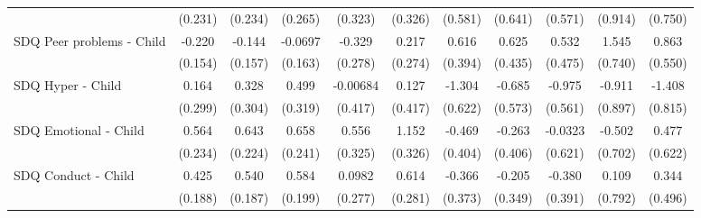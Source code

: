 {\begin{tabular}{l*{10}{c}}
            &     (0.231)         &     (0.234)         &     (0.265)         &     (0.323)         &     (0.326)         &     (0.581)         &     (0.641)         &     (0.571)         &     (0.914)         &     (0.750)         \\
\addlinespace
SDQ Peer problems - Child&      -0.220         &      -0.144         &     -0.0697         &      -0.329         &       0.217         &       0.616         &       0.625         &       0.532         &       1.545\sym{*}  &       0.863         \\
            &     (0.154)         &     (0.157)         &     (0.163)         &     (0.278)         &     (0.274)         &     (0.394)         &     (0.435)         &     (0.475)         &     (0.740)         &     (0.550)         \\
\addlinespace
SDQ Hyper - Child&       0.164         &       0.328         &       0.499         &    -0.00684         &       0.127         &      -1.304\sym{*}  &      -0.685         &      -0.975         &      -0.911         &      -1.408         \\
            &     (0.299)         &     (0.304)         &     (0.319)         &     (0.417)         &     (0.417)         &     (0.622)         &     (0.573)         &     (0.561)         &     (0.897)         &     (0.815)         \\
\addlinespace
SDQ Emotional - Child&       0.564\sym{*}  &       0.643\sym{**} &       0.658\sym{**} &       0.556         &       1.152\sym{***}&      -0.469         &      -0.263         &     -0.0323         &      -0.502         &       0.477         \\
            &     (0.234)         &     (0.224)         &     (0.241)         &     (0.325)         &     (0.326)         &     (0.404)         &     (0.406)         &     (0.621)         &     (0.702)         &     (0.622)         \\
\addlinespace
SDQ Conduct - Child&       0.425\sym{*}  &       0.540\sym{**} &       0.584\sym{**} &      0.0982         &       0.614\sym{*}  &      -0.366         &      -0.205         &      -0.380         &       0.109         &       0.344         \\
            &     (0.188)         &     (0.187)         &     (0.199)         &     (0.277)         &     (0.281)         &     (0.373)         &     (0.349)         &     (0.391)         &     (0.792)         &     (0.496)         \\
\bottomrule
\end{tabular}
}
